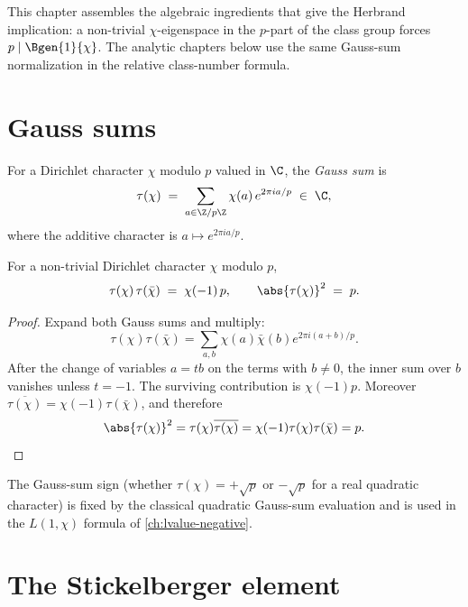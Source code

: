 
This chapter assembles the algebraic ingredients that give the Herbrand
implication: a non-trivial $\chi$-eigenspace in the $p$-part of the
class group forces $p \mid \Bgen{1}{\chi}$.  The analytic chapters below use
the same Gauss-sum normalization in the relative class-number formula.

\section{Gauss sums}

\begin{definition}\label{def:gauss-sum}
  \leanok
For a Dirichlet character $\chi$ modulo $p$ valued in $\C$, the \emph{Gauss
sum} is
\[
  \tau(\chi) \;=\; \sum_{a \in \Z/p\Z} \chi(a)\,e^{2\pi i a / p}
  \;\in\; \C,
\]
where the additive character is \(a \mapsto e^{2\pi i a/p}\).
\end{definition}

\begin{proposition}\label{prop:gauss-norm}
  \leanok
For a non-trivial Dirichlet character $\chi$ modulo $p$,
\[
  \tau(\chi)\,\tau(\bar\chi) \;=\; \chi(-1)\,p,
  \qquad
  \abs{\tau(\chi)}^2 \;=\; p.
\]
\end{proposition}

\begin{proof}\leanok
Expand both Gauss sums and multiply:
\[
  \tau(\chi)\tau(\bar\chi)
  =
  \sum_{a,b}\chi(a)\bar\chi(b)e^{2\pi i(a+b)/p}.
\]
After the change of variables \(a=tb\) on the terms with \(b\ne0\), the
inner sum over \(b\) vanishes unless \(t=-1\).  The surviving contribution
is \(\chi(-1)p\).  Moreover
\(\overline{\tau(\chi)}=\chi(-1)\tau(\bar\chi)\), and therefore
\[
  \abs{\tau(\chi)}^2
  = \tau(\chi)\overline{\tau(\chi)}
  = \chi(-1)\tau(\chi)\tau(\bar\chi)
  = p.
\]
\end{proof}

The Gauss-sum sign (whether $\tau(\chi) = +\sqrt{p}$ or $-\sqrt{p}$ for
a real quadratic character) is fixed by the classical quadratic Gauss-sum
evaluation and is used in the $L(1,\chi)$ formula of
\cref{ch:lvalue-negative}.

\section{The Stickelberger element}

